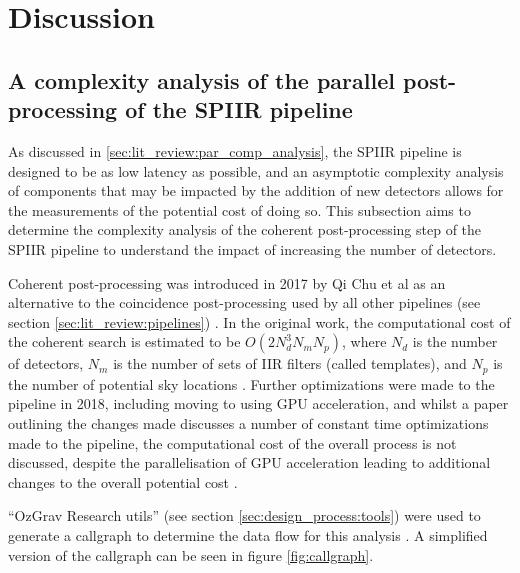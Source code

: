 \documentclass{article}
\begin{document}
\section{Discussion} \label{sec:discuss}

\subsection{A complexity analysis of the parallel post-processing of the SPIIR pipeline} \label{sec:discuss:analysis}

As discussed in \ref{sec:lit_review:par_comp_analysis}, the SPIIR pipeline is designed to be as low latency as possible, and an asymptotic complexity analysis of components that may be impacted by the addition of new detectors allows for the measurements of the potential cost of doing so.
This subsection aims to determine the complexity analysis of the coherent post-processing step of the SPIIR pipeline to understand the impact of increasing the number of detectors.

Coherent post-processing was introduced in 2017 by Qi Chu et al as an alternative to the coincidence post-processing used by all other pipelines (see section \ref{sec:lit_review:pipelines}) \cite{ChuThesis}.
In the original work, the computational cost of the coherent search is estimated to be \(O(2N^3_dN_mN_p)\), where \(N_d\) is the number of detectors, \(N_m\) is the number of sets of IIR filters (called templates), and \(N_p\) is the number of potential sky locations \cite{ChuThesis}.
Further optimizations were made to the pipeline in 2018, including moving to using GPU acceleration, and whilst a paper outlining the changes made discusses a number of constant time optimizations made to the pipeline, the computational cost of the overall process is not discussed, despite the parallelisation of GPU acceleration leading to additional changes to the overall potential cost \cite{SPIIRGPU2018}.

``OzGrav Research utils'' (see section \ref{sec:design_process:tools}) were used to generate a callgraph to determine the data flow for this analysis \cite[see][\texttt{resources/callgraph.png}]{ozgrav_research}.
A simplified version of the callgraph can be seen in figure \ref{fig:callgraph}.
\end{document}
